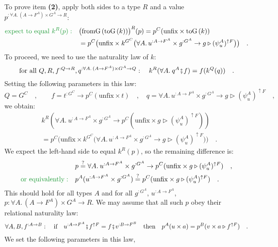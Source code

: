 To prove item \textbf{(2)}, apply both sides to a type $R$ and a
value $p^{:\forall A.\,(A\rightarrow F^{A})\times G^{A}\rightarrow R}$:
\begin{align*}
{\color{greenunder}\text{expect to equal }k^{R}(p):}\quad & \big(\text{fromG}\,(\text{toG}\,(k))\big)^{R}(p)=p^{C}(\text{unfix}\times\text{toG}\,(k))\\
 & =p^{C}\big(\text{unfix}\times k^{G^{C}}\big(\forall A.\,u^{:A\rightarrow F^{A}}\times g^{:G^{A}}\rightarrow g\triangleright(\psi_{u}^{A})^{\uparrow F}\big)\big)\quad.
\end{align*}
To proceed, we need to use the naturality law of $k$:
\[
\text{for all }Q,R,f^{:Q\rightarrow R},q^{:\forall A.\,(A\rightarrow F^{A})\times G^{A}\rightarrow Q}:\quad k^{R}(\forall A.\:q^{A}\bef f)=f(k^{Q}(q))\quad.
\]
Setting the following parameters in this law:
\[
Q=G^{C}\quad,\quad\quad f=t^{:G^{C}}\rightarrow p^{C}(\text{unfix}\times t)\quad,\quad q=\forall A.\,u^{:A\rightarrow F^{A}}\times g^{:G^{A}}\rightarrow g\triangleright(\psi_{u}^{A})^{\uparrow F}\quad,
\]
we obtain:
\begin{align*}
 & k^{R}(\forall A.\:u^{:A\rightarrow F^{A}}\times g^{:G^{A}}\rightarrow p^{C}(\text{unfix}\times g\triangleright(\psi_{u}^{A})^{\uparrow F}))\\
 & =p^{C}\big(\text{unfix}\times k^{G^{C}}\big(\forall A.\,u^{:A\rightarrow F^{A}}\times g^{:G^{A}}\rightarrow g\triangleright(\psi_{u}^{A})^{\uparrow F}\big)\big)\quad.
\end{align*}
We expect the left-hand side to equal $k^{R}(p)$, so the remaining
difference is:
\begin{align*}
 & p\overset{?}{=}\forall A.\:u^{:A\rightarrow F^{A}}\times g^{:G^{A}}\rightarrow p^{C}(\text{unfix}\times g\triangleright(\psi_{u}^{A})^{\uparrow F})\quad,\\
{\color{greenunder}\text{or equivalently}:}\quad & p^{A}(u^{:A\rightarrow F^{A}}\times g^{:G^{A}})\overset{?}{=}p^{C}(\text{unfix}\times g\triangleright(\psi_{u}^{A})^{\uparrow F})\quad.
\end{align*}
This should hold for all types $A$ and for all $g^{:G^{A}}$, $u^{:A\rightarrow F^{A}}$,
$p:\forall A.\,(A\rightarrow F^{A})\times G^{A}\rightarrow R$. We
may assume that all such $p$ obey their relational naturality law:
\[
\forall A,B,f^{:A\rightarrow B}:\quad\text{if}\quad u^{:A\rightarrow F^{A}}\bef f^{\uparrow F}=f\bef v^{:B\rightarrow F^{B}}\quad\text{then}\quad p^{A}(u\times a)=p^{B}(v\times a\triangleright f^{\uparrow F})\quad.
\]
We set the following parameters in this law,
